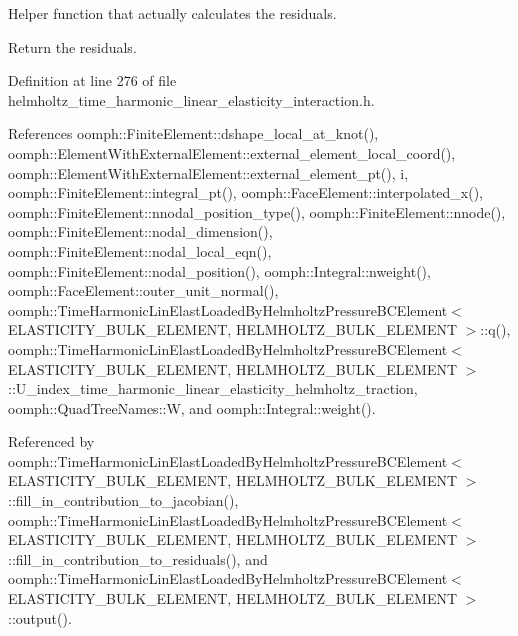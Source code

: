 Helper function that actually calculates the residuals. 

Return the residuals. 

Definition at line 276 of file helmholtz\+\_\+time\+\_\+harmonic\+\_\+linear\+\_\+elasticity\+\_\+interaction.\+h.



References oomph\+::\+Finite\+Element\+::dshape\+\_\+local\+\_\+at\+\_\+knot(), oomph\+::\+Element\+With\+External\+Element\+::external\+\_\+element\+\_\+local\+\_\+coord(), oomph\+::\+Element\+With\+External\+Element\+::external\+\_\+element\+\_\+pt(), i, oomph\+::\+Finite\+Element\+::integral\+\_\+pt(), oomph\+::\+Face\+Element\+::interpolated\+\_\+x(), oomph\+::\+Finite\+Element\+::nnodal\+\_\+position\+\_\+type(), oomph\+::\+Finite\+Element\+::nnode(), oomph\+::\+Finite\+Element\+::nodal\+\_\+dimension(), oomph\+::\+Finite\+Element\+::nodal\+\_\+local\+\_\+eqn(), oomph\+::\+Finite\+Element\+::nodal\+\_\+position(), oomph\+::\+Integral\+::nweight(), oomph\+::\+Face\+Element\+::outer\+\_\+unit\+\_\+normal(), oomph\+::\+Time\+Harmonic\+Lin\+Elast\+Loaded\+By\+Helmholtz\+Pressure\+B\+C\+Element$<$ E\+L\+A\+S\+T\+I\+C\+I\+T\+Y\+\_\+\+B\+U\+L\+K\+\_\+\+E\+L\+E\+M\+E\+N\+T, H\+E\+L\+M\+H\+O\+L\+T\+Z\+\_\+\+B\+U\+L\+K\+\_\+\+E\+L\+E\+M\+E\+N\+T $>$\+::q(), oomph\+::\+Time\+Harmonic\+Lin\+Elast\+Loaded\+By\+Helmholtz\+Pressure\+B\+C\+Element$<$ E\+L\+A\+S\+T\+I\+C\+I\+T\+Y\+\_\+\+B\+U\+L\+K\+\_\+\+E\+L\+E\+M\+E\+N\+T, H\+E\+L\+M\+H\+O\+L\+T\+Z\+\_\+\+B\+U\+L\+K\+\_\+\+E\+L\+E\+M\+E\+N\+T $>$\+::\+U\+\_\+index\+\_\+time\+\_\+harmonic\+\_\+linear\+\_\+elasticity\+\_\+helmholtz\+\_\+traction, oomph\+::\+Quad\+Tree\+Names\+::W, and oomph\+::\+Integral\+::weight().



Referenced by oomph\+::\+Time\+Harmonic\+Lin\+Elast\+Loaded\+By\+Helmholtz\+Pressure\+B\+C\+Element$<$ E\+L\+A\+S\+T\+I\+C\+I\+T\+Y\+\_\+\+B\+U\+L\+K\+\_\+\+E\+L\+E\+M\+E\+N\+T, H\+E\+L\+M\+H\+O\+L\+T\+Z\+\_\+\+B\+U\+L\+K\+\_\+\+E\+L\+E\+M\+E\+N\+T $>$\+::fill\+\_\+in\+\_\+contribution\+\_\+to\+\_\+jacobian(), oomph\+::\+Time\+Harmonic\+Lin\+Elast\+Loaded\+By\+Helmholtz\+Pressure\+B\+C\+Element$<$ E\+L\+A\+S\+T\+I\+C\+I\+T\+Y\+\_\+\+B\+U\+L\+K\+\_\+\+E\+L\+E\+M\+E\+N\+T, H\+E\+L\+M\+H\+O\+L\+T\+Z\+\_\+\+B\+U\+L\+K\+\_\+\+E\+L\+E\+M\+E\+N\+T $>$\+::fill\+\_\+in\+\_\+contribution\+\_\+to\+\_\+residuals(), and oomph\+::\+Time\+Harmonic\+Lin\+Elast\+Loaded\+By\+Helmholtz\+Pressure\+B\+C\+Element$<$ E\+L\+A\+S\+T\+I\+C\+I\+T\+Y\+\_\+\+B\+U\+L\+K\+\_\+\+E\+L\+E\+M\+E\+N\+T, H\+E\+L\+M\+H\+O\+L\+T\+Z\+\_\+\+B\+U\+L\+K\+\_\+\+E\+L\+E\+M\+E\+N\+T $>$\+::output().

